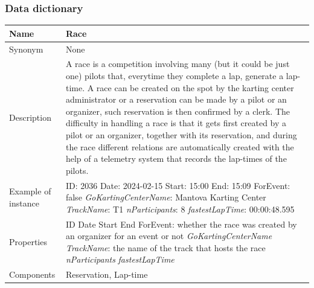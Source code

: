 \documentclass{beamer}
\begin{document}
\begin{frame}
\frametitle{Data dictionary}
\begin{table}
\tiny
\begin{tabular}{|p{2cm}|p{6cm}|}
\hline
Name & \textbf{Race} \\
\hline
Synonym & None \\
\hline
Description & A race is a competition involving many 
(but it could be just one) pilots that, everytime they complete
a lap, generate a lap-time. A race can be created on the spot by
the karting center administrator or a reservation can be made by
a pilot or an organizer, such reservation is then confirmed by a clerk.
The difficulty in handling a race is that it gets first created by
a pilot or an organizer, together with its reservation, and 
during the race different relations are automatically created
with the help of a telemetry system that records the lap-times
of the pilots. \\
\hline
Example of instance &
ID: 2036 \newline
Date: 2024-02-15 \newline
Start: 15:00 \newline
End: 15:09 \newline
ForEvent: false \newline
\textit{GoKartingCenterName}: Mantova Karting Center \newline
\textit{TrackName}: T1 \newline
\textit{nParticipants}: 8 \newline
\textit{fastestLapTime}: 00:00:48.595 \\
\hline
Properties &
ID \newline
Date \newline
Start \newline
End \newline
ForEvent: whether the race was created by an organizer for an event or not \newline
\textit{GoKartingCenterName} \newline
\textit{TrackName}: the name of the track that hosts the race \newline
\textit{nParticipants} \newline
\textit{fastestLapTime} \\
\hline
Components & Reservation, Lap-time \\
\hline
\end{tabular}
\end{table}
\end{frame}
\end{document}
